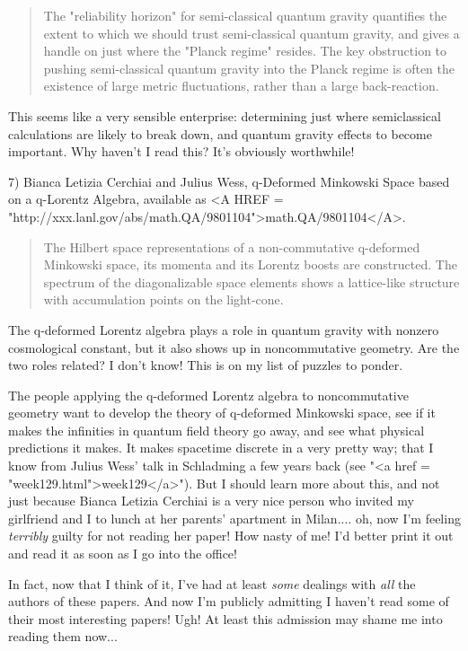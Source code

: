 \begin{quote}
     The "reliability horizon" for semi-classical quantum gravity
     quantifies the extent to which we should trust semi-classical
     quantum gravity, and gives a handle on just where the "Planck
     regime" resides. The key obstruction to pushing semi-classical
     quantum gravity into the Planck regime is often the existence of
     large metric fluctuations, rather than a large back-reaction.

\end{quote}
This seems like a very sensible enterprise: determining just where
semiclassical calculations are likely to break down, and quantum gravity
effects to become important.  Why haven't I read this?  It's obviously
worthwhile!

7) Bianca Letizia Cerchiai and Julius Wess, q-Deformed Minkowski Space
based on a q-Lorentz Algebra, available as
<A HREF = "http://xxx.lanl.gov/abs/math.QA/9801104">math.QA/9801104</A>.

\begin{quote}
     The Hilbert space representations of a non-commutative q-deformed
     Minkowski space, its momenta and its Lorentz boosts are
     constructed. The spectrum of the diagonalizable space elements
     shows a lattice-like structure with accumulation points on the
     light-cone.
\end{quote}
The q-deformed Lorentz algebra plays a role in quantum gravity with
nonzero cosmological constant, but it also shows up in noncommutative
geometry.  Are the two roles related?  I don't know! This is on my list
of puzzles to ponder.


The people applying the q-deformed Lorentz algebra to noncommutative
geometry want to develop the theory of q-deformed Minkowski space, see
if it makes the infinities in quantum field theory go away, and see what
physical predictions it makes.  It makes spacetime discrete in a very
pretty way; that I know from Julius Wess' talk in Schladming a few years
back (see "<a href = "week129.html">week129</a>").  But I should learn more about this, and not just
because Bianca Letizia Cerchiai is a very nice person who invited my
girlfriend and I to lunch at her parents' apartment in Milan.... oh, now
I'm feeling \emph{terribly} guilty for not reading her paper!  How
nasty of me!  I'd better print it out and read it as soon as I go into
the office!

In fact, now that I think of it, I've had at least \emph{some} dealings with
\emph{all} the authors of these papers.  And now I'm publicly admitting I
haven't read some of their most interesting papers!  Ugh!  At least
this admission may shame me into reading them now...

